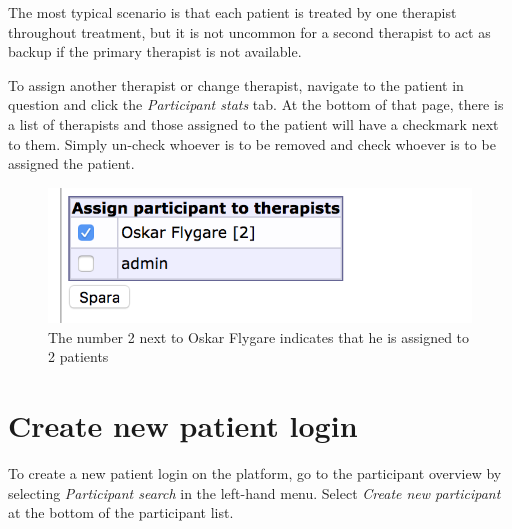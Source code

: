 \documentclass[]{book}
\theoremstyle{definition}
\theoremstyle{definition}
\theoremstyle{definition}
\theoremstyle{remark}
\begin{document}
The most typical scenario is that each patient is treated by one
therapist throughout treatment, but it is not uncommon for a second
therapist to act as backup if the primary therapist is not available.

To assign another therapist or change therapist, navigate to the patient
in question and click the \emph{Participant stats} tab. At the bottom of
that page, there is a list of therapists and those assigned to the
patient will have a checkmark next to them. Simply un-check whoever is
to be removed and check whoever is to be assigned the patient.

\begin{figure}
\centering
\includegraphics{images/assign-therapist.png}
\caption{The number 2 next to Oskar Flygare indicates that he is
assigned to 2 patients}
\end{figure}

\hypertarget{create-new-patient-login}{%
\section{Create new patient login}\label{create-new-patient-login}}

To create a new patient login on the platform, go to the participant
overview by selecting \emph{Participant search} in the left-hand menu.
Select \emph{Create new participant} at the bottom of the participant
list.
\end{document}
